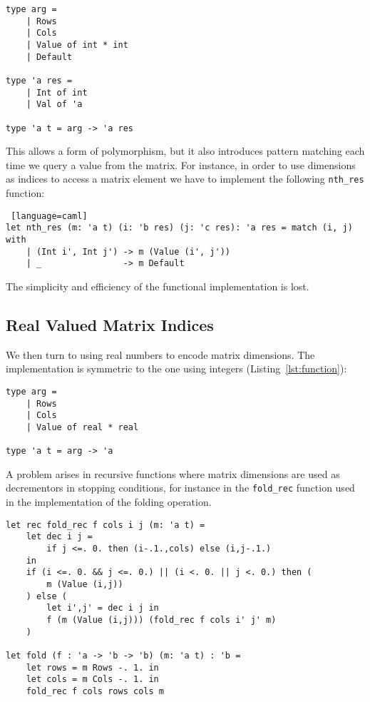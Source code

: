 \documentclass[runningheads]{llncs}
\begin{document}
\begin{lstlisting}[language=caml]
type arg =
	| Rows
	| Cols
	| Value of int * int
	| Default

type 'a res = 
	| Int of int
	| Val of 'a

type 'a t = arg -> 'a res
\end{lstlisting}

This allows a form of polymorphism, but it also introduces pattern matching each time we query a value from the matrix. For instance, in order to use dimensions as indices to access a matrix element we have to implement the following \lstinline{nth_res} function:  

\begin{lstlisting} [language=caml]
let nth_res (m: 'a t) (i: 'b res) (j: 'c res): 'a res = match (i, j) with 
	| (Int i', Int j') -> m (Value (i', j'))
	| _                -> m Default
\end{lstlisting}

The simplicity and efficiency of the functional implementation is lost.

\subsection{Real Valued Matrix Indices}

We then turn to using real numbers to encode matrix dimensions. The implementation is symmetric to the one using integers (Listing~\ref{lst:function}):

\begin{lstlisting}[language=caml]
type arg =
	| Rows
	| Cols
	| Value of real * real

type 'a t = arg -> 'a
\end{lstlisting}

\noindent A problem arises in recursive functions where matrix dimensions are used as decrementors in stopping conditions, for instance in the \lstinline{fold_rec} function used in the implementation of the folding operation.
\begin{lstlisting}[language=caml]
let rec fold_rec f cols i j (m: 'a t) =
	let dec i j =
		if j <=. 0. then (i-.1.,cols) else (i,j-.1.)
	in
	if (i <=. 0. && j <=. 0.) || (i <. 0. || j <. 0.) then (
		m (Value (i,j))
	) else (
		let i',j' = dec i j in
		f (m (Value (i,j))) (fold_rec f cols i' j' m)
	)

let fold (f : 'a -> 'b -> 'b) (m: 'a t) : 'b =
	let rows = m Rows -. 1. in
	let cols = m Cols -. 1. in
	fold_rec f cols rows cols m
\end{lstlisting}
\end{document}
